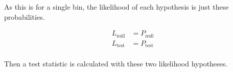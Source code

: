   As this is for a single bin, the likelihood of each hypothesis is just these probabilities.
  
  \begin{equation}
    \begin{split}
      L_{\textrm{null}} & = P_{\textrm{null}} \\
      L_{\textrm{test}} & = P_{\textrm{test}} \\
    \end{split}
  \end{equation}
  
  Then a test statistic is calculated with these two likelihood hypotheses.
  

